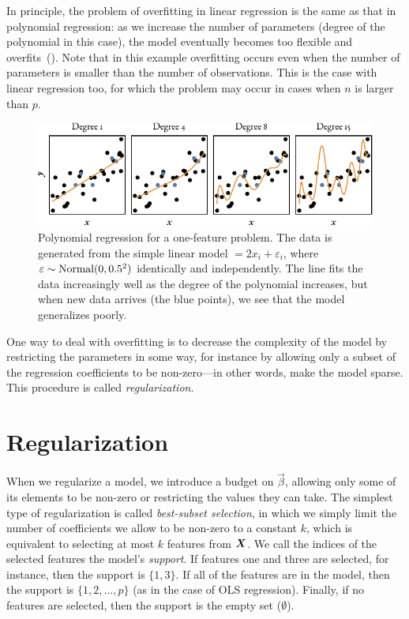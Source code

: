 In principle, the problem of overfitting in linear regression is the same as that in polynomial regression: as we increase the number of parameters (degree of the polynomial in this case), the model eventually becomes too flexible and overfits~().
Note that in this example overfitting occurs even when the number of parameters is smaller than the number of observations. This is the case with linear regression too, for which the problem  may occur in cases when \(n\) is larger than \(p\).

\begin{figure}
  \centering
  \includegraphics[]{figures/polyfit.pdf}
  \caption{%
    Polynomial regression for a one-feature problem.
    The data is generated from the simple linear model \( = 2x_i + \varepsilon_i\),
    where \(\varepsilon \sim \operatorname{Normal}(0, 0.5^2)\) identically and independently.
    The line fits the data increasingly well as the degree of the polynomial increases, but when new data arrives (the blue points), we see that the model generalizes poorly.
  }
  \label{fig:polyfit}
\end{figure}

One way to deal with overfitting is to decrease the complexity of the model by restricting the parameters in some way, for instance by allowing only a subset of the regression coefficients to be non-zero---in other words, make the model sparse. This procedure is called \emph{regularization}.

\section{Regularization}

When we regularize a model, we introduce a budget on \(\vec{\beta}\), allowing only some of its elements to be non-zero or restricting the values they can take.
The simplest type of regularization is called \emph{best-subset selection}, in which we simply limit the number of coefficients we allow to be non-zero to a constant \(k\), which is equivalent to selecting at most \(k\) features from \(\boldsymbol{X}\). We call the indices of the selected features the model's \emph{support}. If features one and three are selected, for instance, then the support is \(\{1,3\}\). If all of the features are in the model, then the support is \(\{1,2,\dots,p\}\) (as in the case of OLS regression). Finally, if no features are selected, then the support is the empty set (\(\emptyset\)).

